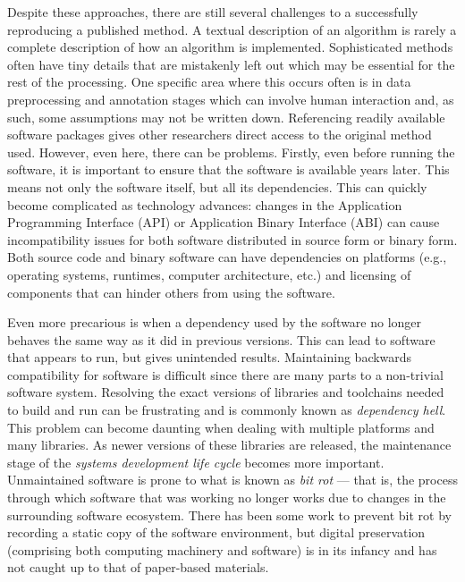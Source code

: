 Despite these approaches, there are still several challenges to a successfully
reproducing a published method.
{ %
	A textual description of an algorithm is rarely a complete description of
	how an algorithm is implemented. Sophisticated methods often have tiny details
	that are mistakenly left out which may be essential for the rest of the
	processing. One specific area where this occurs often is
	in data preprocessing and annotation stages which can
	involve human interaction and, as such, some assumptions
	may not be written down.
}
{ %
	Referencing readily available software packages gives
	other researchers direct access to the original method
	used. However, even here, there can be problems. Firstly,
	even before running the software, it is important to
	ensure that the
	software is available years later. This means not only the software itself, but
	all its dependencies. This can quickly become complicated as technology
	advances: changes in the Application Programming Interface (API) or Application
	Binary Interface (ABI) can cause incompatibility issues for both
	software distributed in source form or
	binary form. Both source code and binary software can have
	dependencies on platforms (e.g., operating systems,
	runtimes, computer architecture, etc.) and licensing of
	components that can hinder others from using the software.
}

{ %
	Even more precarious is when a dependency used by the
	software no longer behaves the same way as it did in
	previous versions. This can lead to software that appears
	to run, but gives unintended results. Maintaining
	backwards compatibility for software is difficult since
	there are many parts to a non-trivial software system.
	Resolving the exact versions of libraries and toolchains
	needed to build and run can be frustrating and is commonly
	known as \emph{dependency hell}. This problem can become
	daunting when dealing with multiple platforms and many
	libraries. As newer versions of these libraries are
	released, the maintenance stage of the \emph{systems
	development life cycle} becomes more important.
	Unmaintained software is prone to what is known as
	\emph{bit rot} --- that is, the process through which
	software that was working no longer works due to changes
	in the surrounding software ecosystem.
	There has been some work to prevent bit rot by recording a
	static copy of the software environment, but digital
	preservation (comprising both computing machinery and
	software) is in its infancy and has not caught up to that
	of paper-based materials.
}


